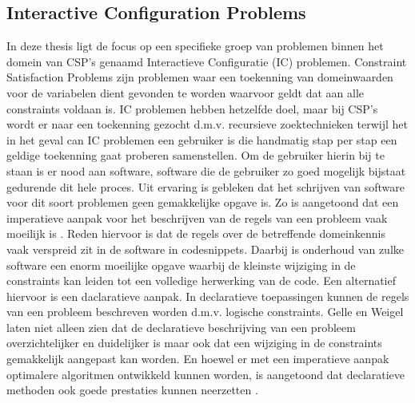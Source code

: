 \subsection{Interactive Configuration Problems}
In deze thesis ligt de focus op een specifieke groep van problemen binnen het domein van CSP's genaamd Interactieve Configuratie (IC) problemen. Constraint Satisfaction Problems zijn problemen waar een toekenning van domeinwaarden voor de variabelen dient gevonden te worden waarvoor geldt dat aan alle constraints voldaan is. IC problemen hebben hetzelfde doel, maar bij CSP's wordt er naar een toekenning gezocht d.m.v. recursieve zoektechnieken terwijl het in het geval can IC problemen een gebruiker is die handmatig stap per stap een geldige toekenning gaat proberen samenstellen. Om de gebruiker hierin bij te staan is er nood aan software, software die de gebruiker zo goed mogelijk bijstaat gedurende dit hele proces. Uit ervaring is gebleken dat het schrijven van software voor dit soort problemen geen gemakkelijke opgave is. Zo is aangetoond dat een imperatieve aanpak voor het beschrijven van de regels van een probleem vaak moeilijk is \citep{gelle1996interactive}. Reden hiervoor is dat de regels over de betreffende domeinkennis vaak verspreid zit in de software in codesnippets. Daarbij is onderhoud van zulke software een enorm moeilijke opgave waarbij de kleinste wijziging in de constraints kan leiden tot een volledige herwerking van de code. Een alternatief hiervoor is een daclaratieve aanpak. In declaratieve toepassingen kunnen de regels van een probleem beschreven worden d.m.v. logische constraints. Gelle en Weigel \cite{gelle1996interactive} laten niet alleen zien dat de declaratieve beschrijving van een probleem overzichtelijker en duidelijker is maar ook dat een wijziging in de constraints gemakkelijk aangepast kan worden. En hoewel er met een imperatieve aanpak optimalere algoritmen ontwikkeld kunnen worden, is aangetoond dat declaratieve methoden ook goede prestaties kunnen neerzetten \citep{vlaeminck2009logical}. 

